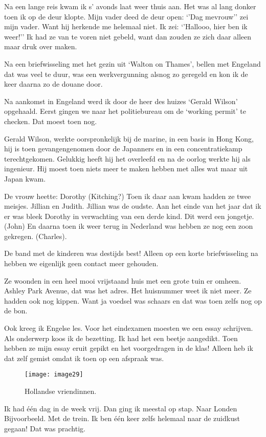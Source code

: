Na een lange reis kwam ik s’ avonds laat weer thuis aan. Het was al lang donker toen ik op de deur klopte. Mijn vader deed de deur open: ‘’Dag mevrouw’’ zei mijn vader. Want hij herkende me helemaal niet. Ik zei: ‘’Hallooo, hier ben ik weer!’’ Ik had ze van te voren niet gebeld, want dan zouden ze zich daar alleen maar druk over maken. 

Na een briefwisseling met het gezin uit ‘Walton on Thames’, bellen met Engeland dat was veel te duur, was een werkvergunning alsnog zo geregeld en kon ik de keer daarna zo de douane door.  

Na aankomst in Engeland werd ik door de heer des huizes ‘Gerald Wilson’ opgehaald. Eerst gingen we naar het politiebureau om de ‘working permit’ te checken. Dat moest toen nog.

Gerald Wilson, werkte oorspronkelijk bij de marine, in een basis in Hong Kong, hij is toen gevangengenomen door de Japanners en in een concentratiekamp terechtgekomen. Gelukkig heeft hij het overleefd en na de oorlog werkte hij als ingenieur. Hij moest toen niets meer te maken hebben met alles wat maar uit Japan kwam.

De vrouw heette: Dorothy (Kitching?) Toen ik daar aan kwam hadden ze twee meisjes. Jillian en Judith. Jillian was de oudste. Aan het einde van het jaar dat ik er was bleek Dorothy in verwachting van een derde kind. Dit werd een jongetje. (John) En daarna toen ik weer terug in Nederland was hebben ze nog een zoon gekregen. (Charles).

De band met de kinderen was destijds best! Alleen op een korte briefwisseling na hebben we eigenlijk geen contact meer gehouden. 

Ze woonden in een heel mooi vrijstaand huis met een grote tuin er omheen. Ashley Park Avenue, dat was het adres. Het huisnummer weet ik niet meer. Ze hadden ook nog kippen. Want ja voedsel was schaars en dat was toen zelfs nog op de bon. 

Ook kreeg ik Engelse les. Voor het eindexamen moesten we een essay schrijven. Als onderwerp koos ik de bezetting. Ik had het een beetje aangedikt. Toen hebben ze mijn essay eruit gepikt en het voorgedragen in de klas! Alleen heb ik dat zelf gemist omdat ik toen op een afspraak was. 

\begin{figure}[h]
    \texttt{[image: image29]}
    \caption{Hollandse vriendinnen.}
\end{figure}

Ik had \'{e}\'{e}n dag in de week vrij. Dan ging ik meestal op stap. Naar Londen Bijvoorbeeld. Met de trein. Ik ben \'{e}\'{e}n keer zelfs helemaal naar de zuidkust gegaan! Dat was prachtig. 

